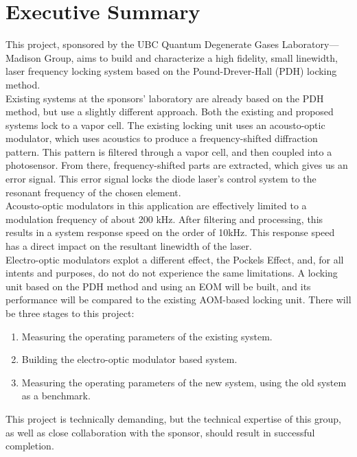 \newpage
\section*{Executive Summary}

This project, sponsored by the UBC Quantum Degenerate Gases
Laboratory---Madison Group, aims to build and characterize a high
fidelity, small linewidth, laser frequency locking system based on the
Pound-Drever-Hall (PDH) locking method. \\

Existing systems at the sponsors' laboratory are already based
on the PDH method, but use a slightly different approach.  Both the
existing and proposed systems lock to a vapor cell.  The
existing locking unit uses an acousto-optic modulator, which uses acoustics
to produce a frequency-shifted diffraction pattern.  This pattern is filtered
through a vapor cell, and then coupled into a photosensor.  From there,
frequency-shifted parts are extracted, which gives us an error signal.  This
error signal locks the diode laser's control system to the resonant frequency
of the chosen element. \\

Acousto-optic modulators in this application are effectively limited to a
modulation frequency of about 200 kHz. After filtering and processing, this
results in a system response speed  on the order of 10kHz. This response speed
has a direct impact on the resultant linewidth of the laser.  \\

Electro-optic modulators explot a different effect, the Pockels Effect, and,
for all intents and purposes, do not do not experience the same limitations. A
locking unit based on the PDH method and using an EOM will
be built, and its performance will be compared to the existing AOM-based
locking unit. There will be three stages to this project:
\begin{enumerate}
 \item Measuring the operating parameters of the existing system.
 \item Building the electro-optic modulator based system.
 \item Measuring the operating parameters of the new system, using the
 old system as a benchmark.
\end{enumerate}
This project is technically demanding, but the technical expertise of this
group, as well as close collaboration with the sponsor, should result in
successful completion.

